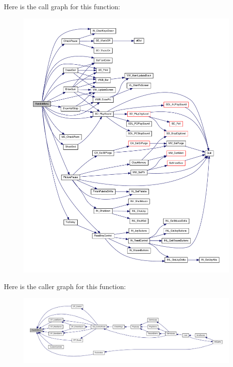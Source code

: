 Here is the call graph for this function:
\nopagebreak
\begin{figure}[H]
\begin{center}
\leavevmode
\includegraphics[width=400pt]{WL__MENU_8H_ad290f8e33560355805666460ffa302b0_cgraph}
\end{center}
\end{figure}




Here is the caller graph for this function:
\nopagebreak
\begin{figure}[H]
\begin{center}
\leavevmode
\includegraphics[width=400pt]{WL__MENU_8H_ad290f8e33560355805666460ffa302b0_icgraph}
\end{center}
\end{figure}


